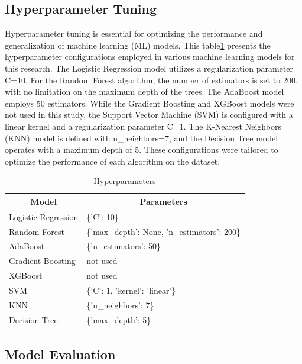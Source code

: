 \documentclass[conference]{IEEEtran} %
\begin{document}
\subsection{Hyperparameter Tuning}
Hyperparameter tuning is essential for optimizing the performance and generalization of machine
learning (ML) models\cite{ref6}. This table\ref{tab:Hyperparameters} presents the hyperparameter configurations employed in various machine learning models for this research. The Logistic Regression model utilizes a regularization parameter C=10. For the Random Forest algorithm, the number of estimators is set to 200, with no limitation on the maximum depth of the trees. The AdaBoost model employs 50 estimators. While the Gradient Boosting and XGBoost models were not used in this study, the Support Vector Machine (SVM) is configured with a linear kernel and a regularization parameter C=1. The K-Nearest Neighbors (KNN) model is defined with n\_neighbors=7, and the Decision Tree model operates with a maximum depth of 5. These configurations were tailored to optimize the performance of each algorithm on the dataset.
\begin{table}[]
\centering
\caption{Hyperparameters}
\label{tab:Hyperparameters}
\begin{tabular}{|l|l|}
\hline
\multicolumn{1}{|c|}{Model} & \multicolumn{1}{c|}{Parameters}              \\ \hline
Logistic Regression         & \{'C': 10\}                                  \\ \hline
Random Forest               & \{'max\_depth': None, 'n\_estimators': 200\} \\ \hline
AdaBoost                    & \{'n\_estimators': 50\}                      \\ \hline
Gradient Boosting           & not used                                     \\ \hline
XGBoost                     & not used                                     \\ \hline
SVM                         & \{'C': 1, 'kernel': 'linear'\}               \\ \hline
KNN                         & \{'n\_neighbors': 7\}                        \\ \hline
Decision Tree               & \{'max\_depth': 5\}                          \\ \hline
\end{tabular}
\end{table}
\FloatBarrier


\subsection{Model Evaluation} 
\end{document}
